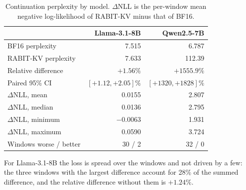 \documentclass{article}
\begin{document}
\begin{table}[h]
\centering
\small
\setlength{\tabcolsep}{3.5pt}
\begin{tabular}{@{}lrr@{}}
\toprule
 & Llama-3.1-8B & Qwen2.5-7B \\
\midrule
BF16 perplexity & 7.515 & 6.787 \\
RABIT-KV perplexity & 7.633 & 112.39 \\
Relative difference & $+1.56\%$ & $+1555.9\%$ \\
Paired 95\% CI & $[+1.12, +2.05]\%$ & $[+1320, +1828]\%$ \\
$\Delta$NLL, mean & 0.0155 & 2.807 \\
$\Delta$NLL, median & 0.0136 & 2.795 \\
$\Delta$NLL, minimum & $-0.0063$ & 1.931 \\
$\Delta$NLL, maximum & 0.0590 & 3.724 \\
Windows worse / better & 30 / 2 & 32 / 0 \\
\bottomrule
\end{tabular}
\caption{Continuation perplexity by model. $\Delta$NLL is the per-window mean negative log-likelihood
of RABIT-KV minus that of BF16.}
\label{tab:app-ppl}
\end{table}

For Llama-3.1-8B the loss is spread over the windows and not driven by a few: the three windows with
the largest difference account for 28\% of the summed difference, and the relative difference without
them is $+1.24\%$.
\end{document}
